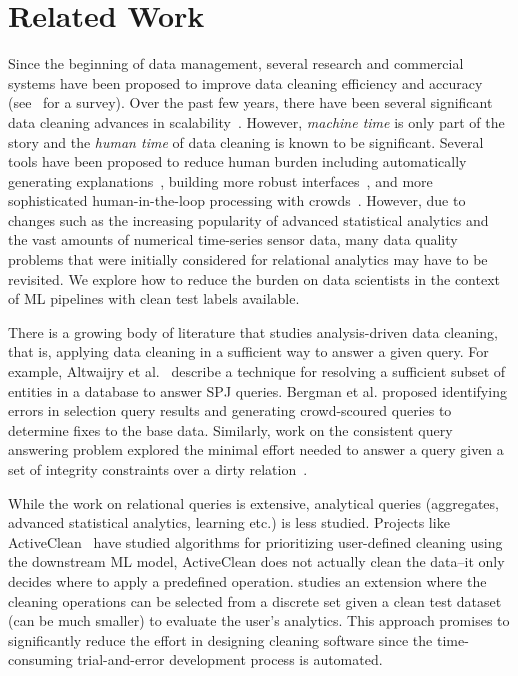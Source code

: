 \section{Related Work}

 Since the beginning of data management, several research and commercial systems have been proposed to improve data cleaning efficiency and accuracy (see~\cite{rahm2000data} for a survey).
Over the past few years, there have been several significant data cleaning advances in scalability~\cite{wang1999sample, khayyat2015bigdansing, altowim2014progressive}.
However, \emph{machine time} is only part of the story and the \emph{human time} of data cleaning is known to be significant.
Several tools have been proposed to reduce human burden including automatically generating explanations~\cite{DBLP:journals/pvldb/0002M13}, building more robust interfaces~\cite{wrangler,trifacta}, and more sophisticated human-in-the-loop processing with crowds~\cite{gokhale2014corleone, park2014crowdfill, DBLP:journals/pvldb/YakoutENOI11, chu2015katara, DBLP:journals/pvldb/HaasKWF015,marcus2015crowdsourced}.
However, due to changes such as the increasing popularity of advanced statistical analytics and the vast amounts of numerical time-series sensor data, many data quality problems that were initially considered for relational analytics may have to be revisited.
We explore how to reduce the burden on data scientists in the context of ML pipelines with clean test labels available.

 There is a growing body of literature that studies analysis-driven data cleaning, that is, applying data cleaning in a sufficient way to answer a given query.
For example, Altwaijry et al.~\cite{altwaijry2015query} describe a technique for resolving a sufficient subset of entities in a database to answer SPJ queries.
Bergman et al. \cite{DBLP:conf/sigmod/BergmanMNT15} proposed identifying errors in selection query results and generating crowd-scoured queries to determine fixes to the base data.
Similarly, work on the consistent query answering problem explored the minimal effort needed to answer a query given a set of integrity constraints over a dirty relation~\cite{DBLP:series/synthesis/2011Bertossi}.

While the work on relational queries is extensive, analytical queries (aggregates, advanced statistical analytics, learning etc.) is less studied.
Projects like ActiveClean~\cite{DBLP:journals/pvldb/KrishnanWWFG16} have studied algorithms for prioritizing user-defined cleaning using the downstream ML model, ActiveClean does not actually clean the data--it only decides where to apply a predefined operation.
\sys studies an extension where the cleaning operations can be selected from a discrete set given a clean test dataset (can be much smaller) to evaluate the user's analytics.
This approach promises to significantly reduce the effort in designing cleaning software since the time-consuming trial-and-error development process is automated.

